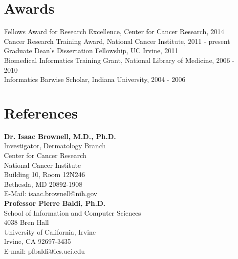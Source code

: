 \documentclass[margin,line]{res}
\begin{document}
\begin{resume}
\section{\sc Awards}
Fellows Award for Research Excellence, Center for Cancer Research, 2014\\
Cancer Research Training Award, National Cancer Institute, 2011 - present\\
Graduate Dean’s Dissertation Fellowship, UC Irvine, 2011\\
Biomedical Informatics Training Grant, National Library of Medicine, 2006 - 2010\\
Informatics Barwise Scholar, Indiana University, 2004 - 2006


\section{\sc References} 

\textbf{Dr. Isaac Brownell, M.D., Ph.D.}\\
Investigator, Dermatology Branch\\
Center for Cancer Research\\
National Cancer Institute\\
Building 10, Room 12N246\\
Bethesda, MD 20892-1908\\
E-Mail: isaac.brownell@nih.gov\\

\textbf{Professor Pierre Baldi, Ph.D.}\\
School of Information and Computer Sciences\\
4038 Bren Hall\\
University of California, Irvine\\
Irvine, CA 92697-3435\\
E-mail: pfbaldi@ics.uci.edu\\

\end{resume}
\end{document}

